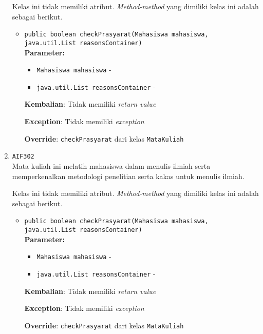 \documentclass{article}
\begin{document}
\begin{enumerate}
Kelas ini tidak memiliki atribut. \textit{Method-method} yang dimiliki kelas ini adalah sebagai berikut.
\begin{itemize}
\item \texttt{public boolean checkPrasyarat(Mahasiswa mahasiswa, java.util.List reasonsContainer)}\\ 


\textbf{Parameter:}\begin{itemize}
\item \texttt{Mahasiswa mahasiswa} - 
\item \texttt{java.util.List reasonsContainer} - 
\end{itemize}
\textbf{Kembalian}: Tidak memiliki \textit{return value}

\textbf{Exception}: Tidak memiliki \textit{exception}

\textbf{Override}: \texttt{checkPrasyarat} dari kelas \texttt{MataKuliah}

\end{itemize}
\item \texttt{AIF302}\\ 
Mata kuliah ini melatih mahasiswa dalam menulis ilmiah serta memperkenalkan
 metodologi penelitian serta kakas untuk menulis ilmiah.

Kelas ini tidak memiliki atribut. \textit{Method-method} yang dimiliki kelas ini adalah sebagai berikut.
\begin{itemize}
\item \texttt{public boolean checkPrasyarat(Mahasiswa mahasiswa, java.util.List reasonsContainer)}\\ 


\textbf{Parameter:}\begin{itemize}
\item \texttt{Mahasiswa mahasiswa} - 
\item \texttt{java.util.List reasonsContainer} - 
\end{itemize}
\textbf{Kembalian}: Tidak memiliki \textit{return value}

\textbf{Exception}: Tidak memiliki \textit{exception}

\textbf{Override}: \texttt{checkPrasyarat} dari kelas \texttt{MataKuliah}


\end{itemize}
\end{enumerate}
\end{document}
